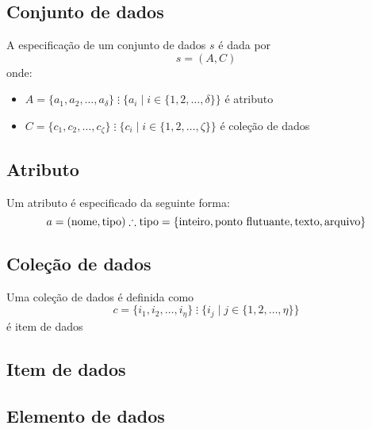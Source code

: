 \subsection{Conjunto de dados}

A especificação de um conjunto de dados \( s \) é dada por \[ s = (A, C) \] onde:
\begin{itemize}
    \item \( A = \{a_1, a_2, \ldots, a_{\delta} \} \; \vdots{} \; \{ a_i \mid i \in \{1, 2, \ldots, \delta \} \} \) é atributo
    \item \( C = \{c_1, c_2, \ldots, c_{\zeta} \} \; \vdots{} \; \{ c_i \mid i \in \{1, 2, \ldots, \zeta \} \} \) é coleção de dados
\end{itemize}

\subsection{Atributo}

Um atributo é especificado da seguinte forma: \[ a = (\textrm{nome},\textrm{tipo}) \therefore \textrm{tipo} = \{\textup{inteiro}, \textup{ponto flutuante}, \textup{texto}, \textup{arquivo}\} \]

\subsection{Coleção de dados}

Uma coleção de dados é definida como \[ c = \{ i_1, i_2, \ldots, i_{\eta} \} \; \vdots \; \{ i_j \mid j \in \{ 1, 2, \ldots, \eta \} \} \] é item de dados

\subsection{Item de dados}

\subsection{Elemento de dados}
